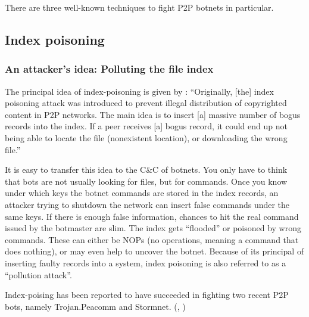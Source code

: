 \documentclass{llncs}
\begin{document}
There are three well-known techniques to fight P2P botnets in
particular.

\subsection{Index poisoning}
\label{indexpoisoning}
\subsubsection{An attacker's idea: Polluting the file index}
The principal idea of index-poisoning is given by
\cite{wang2009systematic}: ``Originally, [the] index poisoning attack was
introduced to prevent illegal distribution of copyrighted content in
P2P networks. The main idea is to insert [a] massive number of bogus
records into the index. If a peer receives [a] bogus record, it could end
up not being able to locate the file (nonexistent location), or
downloading the wrong file.''

It is easy to transfer this idea to the C\&C of botnets. You only have
to think that bots are not usually looking for files, but for
commands. Once you know under which keys the botnet commands are
stored in the index records, an attacker trying to shutdown the
network can insert false commands under the same keys. If there is
enough false information, chances to hit the real command issued by
the botmaster are slim. The index gets ``flooded'' or poisoned by wrong
commands. These can either be NOPs (no operations, meaning a command
that does nothing), or may even help to uncover the botnet. Because
of its principal of inserting faulty records into a system, index
poisoning is also referred to as a ``pollution
attack''\cite{liang2006index}.

Index-poising has been reported to have succeeded
in fighting two recent P2P bots, namely Trojan.Peacomm and
Stormnet. (\cite{grizzard2007peer}, \cite{liang2006index})
\end{document}
